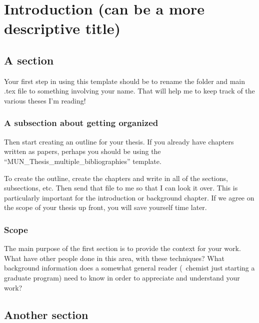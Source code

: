 \chapter{Introduction (can be a more descriptive title)}\label{ch:intro}
\setcounter{secnumdepth}{3} 
\setcounter{page}{1} \pagestyle{myheadings}
\markboth{}{}\markright{} \rhead{\thepage} \setcounter{page}{1}
\pagestyle{myheadings}  \rhead{\thepage}
\setcounter{page}{1}

\section{A section}

Your first step in using this template should be to rename the folder and main .tex file to something involving your name.  That will help me to keep track of the various theses I'm reading!


\subsection{A subsection about getting organized}\label{sect:org}

Then start creating an outline for your thesis.  If you already have chapters written as papers, perhaps you should be using the ``MUN\_Thesis\_multiple\_bibliographies'' template.

To create the outline, create the chapters and write in all of the sections, subsections, etc. Then send that file to me so that I can look it over.  This is particularly important for the introduction or background chapter.  If we agree on the scope of your thesis up front, you will save yourself time later.

\subsection{Scope}

The main purpose of the first section is to provide the context for your work.  What have other people done in this area, with these techniques?  What background information does a somewhat general reader (\eg\ chemist just starting a graduate program) need to know in order to appreciate and understand your work?

\section{Another section}

